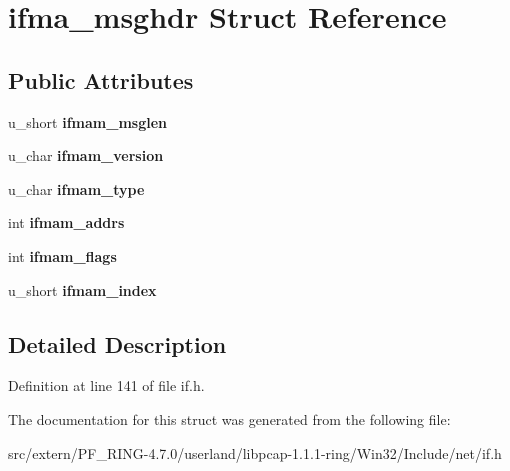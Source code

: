 \hypertarget{structifma__msghdr}{
\section{ifma\_\-msghdr Struct Reference}
\label{structifma__msghdr}
}
\subsection*{Public Attributes}
\begin{DoxyCompactItemize}
\item 
\hypertarget{structifma__msghdr_ae98244fa067bf135bf0d06b3bf2a6531}{
u\_\-short {\bfseries ifmam\_\-msglen}}
\label{structifma__msghdr_ae98244fa067bf135bf0d06b3bf2a6531}

\item 
\hypertarget{structifma__msghdr_a66ac6c4ccf983421b746afc49ec4ca38}{
u\_\-char {\bfseries ifmam\_\-version}}
\label{structifma__msghdr_a66ac6c4ccf983421b746afc49ec4ca38}

\item 
\hypertarget{structifma__msghdr_a1389988446252efeaaea1cebe4aeff38}{
u\_\-char {\bfseries ifmam\_\-type}}
\label{structifma__msghdr_a1389988446252efeaaea1cebe4aeff38}

\item 
\hypertarget{structifma__msghdr_a2b0ee37148ecde666ea8b5a80a7f6ec6}{
int {\bfseries ifmam\_\-addrs}}
\label{structifma__msghdr_a2b0ee37148ecde666ea8b5a80a7f6ec6}

\item 
\hypertarget{structifma__msghdr_ac9c9b310e7167a76bf949c5d73d8003d}{
int {\bfseries ifmam\_\-flags}}
\label{structifma__msghdr_ac9c9b310e7167a76bf949c5d73d8003d}

\item 
\hypertarget{structifma__msghdr_a6ffea0bc97f5131474517c544f40e641}{
u\_\-short {\bfseries ifmam\_\-index}}
\label{structifma__msghdr_a6ffea0bc97f5131474517c544f40e641}

\end{DoxyCompactItemize}


\subsection{Detailed Description}


Definition at line 141 of file if.h.



The documentation for this struct was generated from the following file:\begin{DoxyCompactItemize}
\item 
src/extern/PF\_\-RING-\/4.7.0/userland/libpcap-\/1.1.1-\/ring/Win32/Include/net/if.h\end{DoxyCompactItemize}
